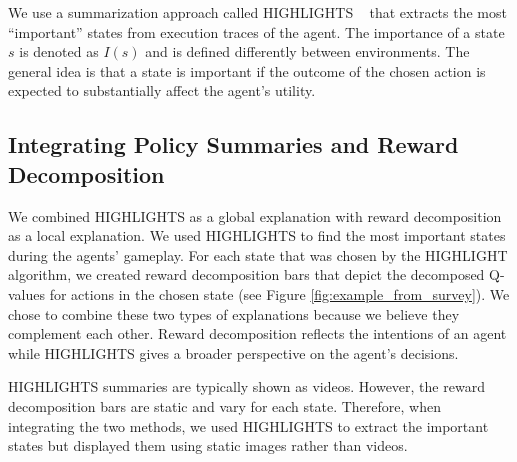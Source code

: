 \documentclass[runningheads]{llncs}
\begin{document}
We use a summarization approach called HIGHLIGHTS ~\cite{amir2018highlights} that extracts the most ``important'' states from execution traces of the agent. 
The importance of a state $s$ is denoted as $I(s)$ and is defined differently between environments.
The general idea is that a state is important if the outcome of the chosen action is expected to substantially affect the agent's utility.

\subsection{Integrating Policy Summaries and Reward Decomposition}
We combined HIGHLIGHTS as a global explanation with reward decomposition as a local explanation. 
We used HIGHLIGHTS to find the most important states during the agents' gameplay. 
For each state that was chosen by the HIGHLIGHT algorithm, we created reward decomposition bars that depict the decomposed Q-values for actions in the chosen state (see Figure \ref{fig:example_from_survey}).
We chose to combine these two types of explanations because we believe they complement each other.
Reward decomposition reflects the intentions of an agent while HIGHLIGHTS gives a broader perspective on the agent's decisions.

HIGHLIGHTS summaries are typically shown as videos. However, the reward decomposition bars are static and vary for each state. Therefore, when integrating the two methods, we used HIGHLIGHTS to extract the important states but displayed them using static images rather than videos.
\end{document}
